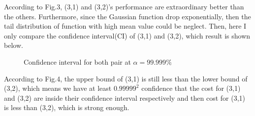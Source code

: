 \documentclass[letterpaper, 10 pt, conference]{ieeeconf}
\begin{document}
According to Fig.3, (3,1) and (3,2)'s performance are extraordinary better than the others. Furthermore, since the Gaussian function drop exponentially, then the tail distribution of function with high mean value could be neglect. Then, here I only compare the confidence interval(CI) of (3,1) and (3,2), which result is shown below.

\begin{figure}[thpb]
   \centering
   \caption{Confidence interval for both pair at $\alpha =  99.999\%$}
\end{figure}


According to Fig.4, the upper bound of (3,1) is still less than the lower bound of (3,2), which means we have at least $0.99999^2$ confidence that the cost for (3,1) and (3,2) are inside their confidence interval respectively and then cost for (3,1) is less than (3,2), which is strong enough.
\end{document}

